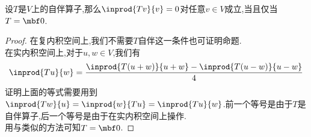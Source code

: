 \documentclass{ctexart}
\begin{document}
\begin{formal}[2.4 非零自伴算子不会使$\inprod{Tv}{v}=0$]
    设$T$是$V$上的自伴算子,那么$\inprod{Tv}{v}=0$对任意$v\in V$成立,当且仅当$T=\mbf0$.
\end{formal}
\begin{proof}
    在复内积空间上,我们不需要$T$自伴这一条件也可证明命题.\\
    在实内积空间上,对于$u,w\in V$,我们有
    \[\inprod{Tu}{w}=\dfrac{\inprod{T(u+w)}{u+w}-\inprod{T(u-w)}{u-w}}{4}\]
    证明上面的等式需要用到$\inprod{Tw}{u}=\inprod{w}{Tu}=\inprod{Tu}{w}$.前一个等号是由于$T$是自伴算子,后一个等号是由于在实内积空间上操作.\\
    用与类似的方法可知$T=\mbf0$.
\end{proof}
\end{document}
